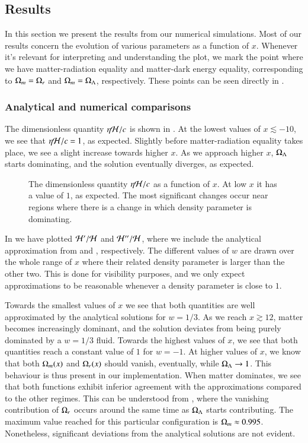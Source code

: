 \subsection{Results}\label{ssec:M1:results}
In this section we present the results from our numerical simulations. Most of our results concern the evolution of various parameters as a function of $x$. Whenever it's relevant for interpreting and understanding the plot, we mark the point where we have matter-radiation equality and matter-dark energy equality, corresponding to $\Omega_{m}=\Omega_{r}$ and $\Omega_{m}=\Omega_{\Lambda}$, respectively. These points can be seen directly in . 

\subsubsection{Analytical and numerical comparisons}
The dimensionless quantity $\eta\mathcal{H}/c$ is shown in . At the lowest values of $x\lesssim-10$, we see that $\eta\mathcal{H}/c=1$, as expected. Slightly before matter-radiation equality takes place, we see a slight increase towards higher $x$. As we approach higher $x$, $\Omega_{\Lambda}$ starts dominating, and the solution eventually diverges, as expected.  
\begin{figure}[ht!]
    \caption{The dimensionless quantity $\eta\mathcal{H}/c$ as a function of $x$. At low $x$ it has a value of $1$, as expected. The most significant changes occur near regions where there is a change in which density parameter is dominating.}
    \label{fig:M1:results:compare_eta_H_over_c}
\end{figure}

In  we have plotted $\mathcal{H}'/\mathcal{H}$ and $\mathcal{H}''/\mathcal{H}$, where we include the analytical approximation from  and , respectively. The different values of $w$ are drawn over the whole range of $x$ where their related density parameter is larger than the other two. This is done for visibility purposes, and we only expect approximations to be reasonable whenever a density parameter is close to $1$. 

Towards the smallest values of $x$ we see that both quantities are well approximated by the analytical solutions for $w=1/3$. As we reach $x\gtrsim12$, matter becomes increasingly dominant, and the solution deviates from being purely dominated by a $w=1/3$ fluid. Towards the highest values of $x$, we see that both quantities reach a constant value of $1$ for $w=-1$. At higher values of $x$, we know that both $\Omega_{m}(x)$ and $\Omega_{r}(x)$ should vanish, eventually, while $\Omega_{\Lambda}\to1$. This behaviour is thus present in our implementation. When matter dominates, we see that both functions exhibit inferior agreement with the approximations compared to the other regimes. This can be understood from , where the vanishing contribution of $\Omega_{r}$ occurs around the same time as $\Omega_{\Lambda}$ starts contributing. The maximum value reached for this particular configuration is $\Omega_{m}\approx0.995$. Nonetheless, significant deviations from the analytical solutions are not evident.
 

